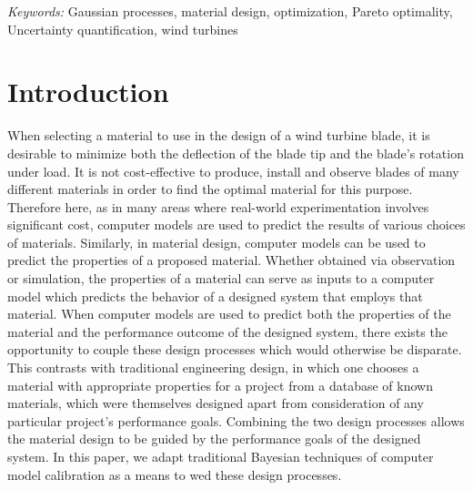 \documentclass[12pt]{article}
\begin{document}
\noindent%
{\it Keywords:}  Gaussian processes, material design, optimization, Pareto optimality, Uncertainty quantification, wind turbines
\vfill

\newpage
{} %
\section{Introduction}
\label{introduction}

When selecting a material to use in the design of a wind turbine blade, it is desirable to minimize both the deflection of the blade tip and the blade's rotation under load.
%
It is not cost-effective to produce, install and observe blades of many different materials in order to find the optimal material for this purpose.
%
Therefore here, as in many areas where real-world experimentation involves significant cost, computer models are used to predict the results of various choices of materials.
%
Similarly, in material design, computer models can be used to predict the properties of a proposed material.
%
Whether obtained via observation or simulation, the properties of a material can serve as inputs to a computer model which predicts the behavior of a designed system that employs that material.
%
When computer models are used to predict both the properties of the material and the performance outcome of the designed system, there exists the opportunity to couple these design processes which would otherwise be disparate.
%
This contrasts with traditional engineering design, in which one chooses a material with appropriate properties for a project from a database of known materials, which were themselves designed apart from consideration of any particular project's performance goals.
%
Combining the two design processes allows the material design to be guided by the performance goals of the designed system.
%
In this paper, we adapt traditional Bayesian techniques of computer model calibration as a means to wed these design processes.
%
\end{document}
